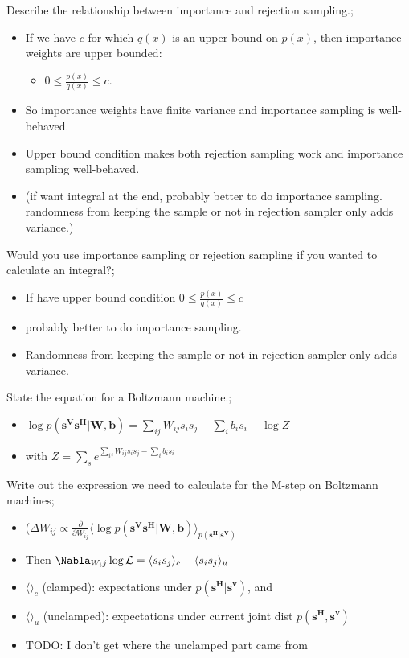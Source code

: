 \documentclass{article}
\begin{document}
Describe the relationship between importance and rejection sampling.; \begin{itemize}
    \item If we have $c$ for which $q(x)$ is an upper bound on $p(x)$, then importance weights are upper bounded: \begin{itemize}
        \item $0 \leq \frac{p(x)}{q(x)} \leq c$.
    \end{itemize}
    \item So importance weights have finite variance and importance sampling is well-behaved.
    \item Upper bound condition makes both rejection sampling work and importance sampling well-behaved.
    \item (if want integral at the end, probably better to do importance sampling. randomness from keeping the sample or not in rejection sampler only adds variance.)
\end{itemize}

Would you use importance sampling or rejection sampling if you wanted to calculate an integral?; \begin{itemize}
    \item If have upper bound condition $0 \leq \frac{p(x)}{q(x)} \leq c$
    \item probably better to do importance sampling. 
    \item Randomness from keeping the sample or not in rejection sampler only adds variance.
\end{itemize}

State the equation for a Boltzmann machine.; \begin{itemize}
    \item $\log p(\mathbf{s^Vs^H|W, b}) = \sum_{ij}W_{ij}s_is_j - \sum_i b_is_i - \log Z$
    \item with $Z = \sum_s e^{\sum_{ij}W_{ij}s_is_j - \sum_i b_i s_i}$
\end{itemize}

Write out the expression we need to calculate for the M-step on Boltzmann machines; \begin{itemize}
    \item ($\Delta W_{ij} \propto \frac{\partial}{\partial W_{ij}} \langle \log p(\mathbf{s^Vs^H|W, b}) \rangle_{p(\mathbf{s^H|s^V})}$
    \item Then $\Nabla_{W_ij} \log \mathcal{L} = \langle s_is_j \rangle_c - \langle s_is_j \rangle_u$
    \item $\langle \rangle_c$ (clamped): expectations under $p(\mathbf{s^H|s^v})$, and 
    \item $\langle \rangle_u$ (unclamped): expectations under current joint dist $p(\mathbf{s^H, s^v})$
    \item TODO: I don't get where the unclamped part came from
\end{itemize}
\end{document}
